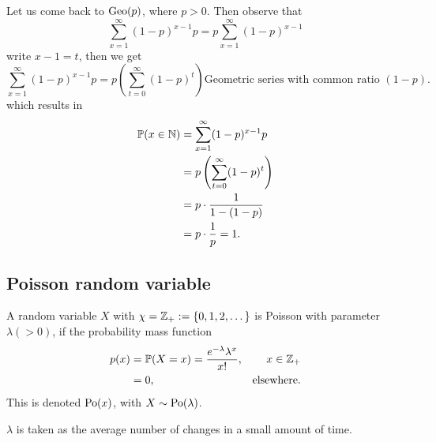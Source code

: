 \documentclass[10pt, a4paper]{article}
\begin{document}
Let us come back to $\operatorname{Geo}(p)$,
where $p > 0$.
Then observe that
\[
\sum_{x = 1}^{\infty}(1 - p) ^ {x - 1}p = p\sum_{x = 1}^{\infty}(1 - p) ^ {x - 1}
\]
write $x - 1 = t$,
then we get
\[
\sum_{x = 1}^{\infty}(1 - p) ^ {x - 1}p = p\left(\sum_{t = 0}^{\infty}(1 - p) ^ t\right)\text{Geometric series with common ratio $(1 - p)$.}
\]
which results in
\begin{align*}
    \mathbb{P}(x \in \mathbb{N}) &= \sum_{x = 1}^{\infty}(1 - p) ^ {x - 1}p \\
    &= p\left(\sum_{t = 0}^{\infty}(1 - p) ^ t\right) \\
    &= p \cdot \frac{1}{1 - (1 - p)} \\
    &= p \cdot \frac{1}{p} = 1.
\end{align*}

\subsection{Poisson random variable}
\begin{definition}
    A random variable $X$ with $\chi = \mathbb{Z}_+ := \{0, 1, 2, \dotsc\}$ is Poisson with parameter $\lambda (> 0)$,
    if the probability mass function
    \begin{align*}
        p(x) &= \mathbb{P}(X = x) = \frac{e ^ {-\lambda}\lambda ^ x}{x!},& x \in \mathbb{Z}_+ \\
        &= 0,&\text{elsewhere}.
    \end{align*}
    This is denoted $\operatorname{Po}(x)$, with $X \sim \operatorname{Po}(\lambda)$.
\end{definition}
$\lambda$ is taken as the average number of changes in a small amount of time.
\end{document}
